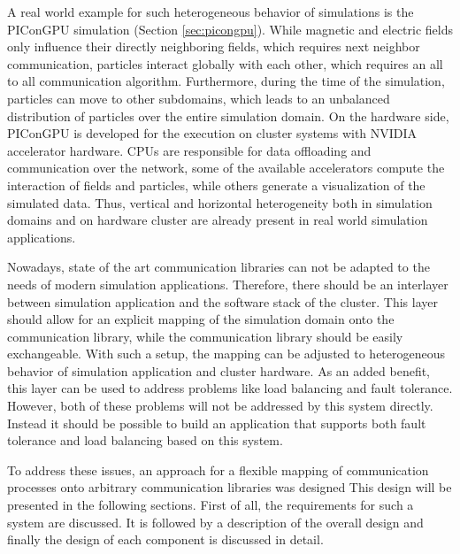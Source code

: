 A real world example for such heterogeneous behavior of simulations is
the PIConGPU simulation (Section \ref{sec:picongpu}). While magnetic
and electric fields only influence their directly neighboring fields,
which requires next neighbor communication, particles interact
globally with each other, which requires an all to all communication
algorithm.  Furthermore, during the time of the simulation, particles
can move to other subdomains, which leads to an unbalanced
distribution of particles over the entire simulation domain. On the
hardware side, PIConGPU is developed for the execution on cluster
systems with NVIDIA accelerator hardware.  CPUs are responsible for
data offloading and communication over the network, some of the
available accelerators compute the interaction of fields and
particles, while others generate a visualization of the simulated
data. Thus, vertical and horizontal heterogeneity both in simulation
domains and on hardware cluster are already present in real world
simulation applications.

Nowadays, state of the art communication libraries can not be adapted
to the needs of modern simulation applications.  Therefore, there
should be an interlayer between simulation application and the
software stack of the cluster. This layer should allow for an explicit
mapping of the simulation domain onto the communication library, while
the communication library should be easily exchangeable. With such a
setup, the mapping can be adjusted to heterogeneous behavior of
simulation application and cluster hardware.  As an added benefit,
this layer can be used to address problems like load balancing and
fault tolerance. However, both of these problems will not be addressed
by this system directly. Instead it should be possible to build an
application that supports both fault tolerance and load balancing
based on this system.

To address these issues, an approach for a flexible mapping of
communication processes onto arbitrary communication libraries was
designed This design will be presented in the following
sections. First of all, the requirements for such a system are
discussed. It is followed by a description of the overall design and
finally the design of each component is discussed in detail.


